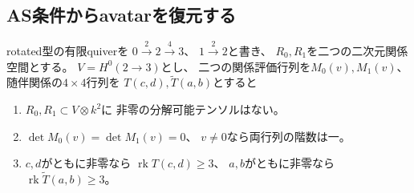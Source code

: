 \subsection{AS条件からavatarを復元する}
\label{subsec:qa-as-to-avatar}

\begin{lemma}[AS条件が強制する階数]
\label{lem:qa-as-required-ranks}
rotated型の有限quiverを
$0\overset{2}{\longrightarrow}2
 \overset{4}{\longrightarrow}3$、
$1\overset{2}{\longrightarrow}2$と書き、
$R_0,R_1$を二つの二次元関係空間とする。
$V=H^0(2\to3)$とし、
二つの関係評価行列を$M_0(v),M_1(v)$、
随伴関係の$4\times4$行列を
$T(c,d),\widetilde T(a,b)$とすると
\begin{enumerate}
\item $R_0,R_1\subset V\otimes k^2$に
 非零の分解可能テンソルはない。
\item $\det M_0(v)=\det M_1(v)=0$、
 $v\ne0$なら両行列の階数は一。
\item $c,d$がともに非零なら
 $\operatorname{rk}T(c,d)\ge3$、
 $a,b$がともに非零なら
 $\operatorname{rk}\widetilde T(a,b)\ge3$。
\end{enumerate}
\end{lemma}

